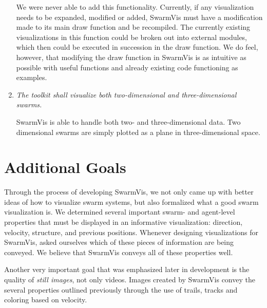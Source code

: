 \documentclass{article}
\begin{document}
\begin{enumerate}
We were never able to add this functionality. Currently, if any visualization needs to  be expanded, modified or added, SwarmVis must have a modification made to its main draw function and be recompiled. The currently existing visualizations in this function could be broken out into external modules, which then could be executed in succession in the draw function. We do feel, however, that modifying the draw function in SwarmVis is as intuitive as possible with useful functions and already existing code functioning as examples.

\item {\em The toolkit shall visualize both two-dimensional and three-dimensional swarms.}

SwarmVis is able to handle both two- and three-dimensional data. Two dimensional swarms are simply plotted as a plane in three-dimensional space.

\end{enumerate}

\section{Additional Goals}

Through the process of developing SwarmVis, we not only came up with better ideas of how to visualize swarm systems, but also formalized what a good swarm visualization is. We determined several important swarm- and agent-level properties that must be displayed in an informative visualization: direction, velocity, structure, and previous positions. Whenever designing visualizations for SwarmVis, asked ourselves  which of these pieces of information are being conveyed. We believe that SwarmVis conveys all of these properties well.

Another very important goal that was emphasized later in development is the quality of {\em still images}, not only videos. Images created by SwarmVis convey the several properties outlined previously through the use of trails, tracks and coloring based on velocity.
\end{document}
